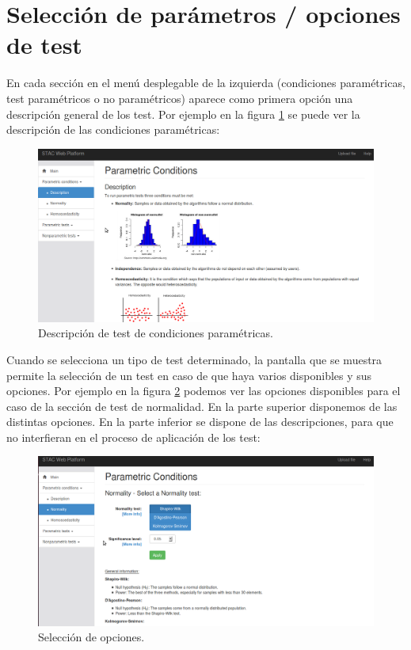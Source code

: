 \section{Selección de parámetros / opciones de test}

En cada sección en el menú desplegable de la izquierda (condiciones paramétricas, test paramétricos o no paramétricos) aparece como primera opción una descripción general de los test. Por ejemplo en la figura \ref{fig:man_descripcion} se puede ver la descripción de las condiciones paramétricas:

\begin{figure}[H]
\centering
\includegraphics[scale=0.4]{figuras/man_descripcion.png}
\caption{Descripción de test de condiciones paramétricas.}
\label{fig:man_descripcion}
\end{figure}

Cuando se selecciona un tipo de test determinado, la pantalla que se muestra permite la selección de un test en caso de que haya varios disponibles y sus opciones. Por ejemplo en la figura \ref{fig:man_opciones} podemos ver las opciones disponibles para el caso de la sección de test de normalidad. En la parte superior disponemos de las distintas opciones. En la parte inferior se dispone de las descripciones, para que no interfieran en el proceso de aplicación de los test:

\begin{figure}[H]
\centering
\includegraphics[scale=0.4]{figuras/man_opciones.png}
\caption{Selección de opciones.}
\label{fig:man_opciones}
\end{figure}

